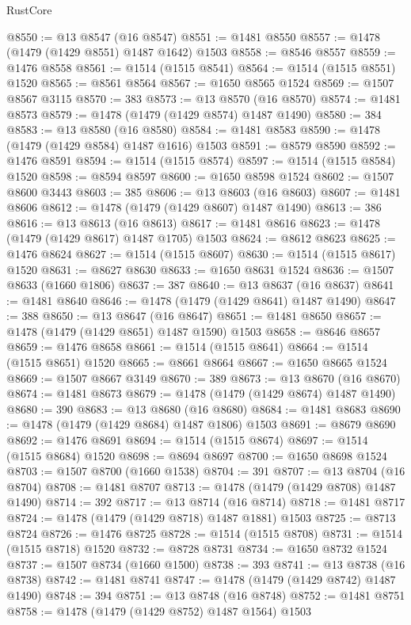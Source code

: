 \begin{lexlean}{RustCore}
\begin{coremodule}
@8550 := @13 @8547 (@16 @8547)
@8551 := @1481 @8550
@8557 := @1478 (@1479 (@1429 @8551) @1487 @1642) @1503
@8558 := @8546 @8557
@8559 := @1476 @8558
@8561 := @1514 (@1515 @8541)
@8564 := @1514 (@1515 @8551) @1520
@8565 := @8561 @8564
@8567 := @1650 @8565 @1524
@8569 := @1507 @8567 @3115
@8570 := 383
@8573 := @13 @8570 (@16 @8570)
@8574 := @1481 @8573
@8579 := @1478 (@1479 (@1429 @8574) @1487 @1490)
@8580 := 384
@8583 := @13 @8580 (@16 @8580)
@8584 := @1481 @8583
@8590 := @1478 (@1479 (@1429 @8584) @1487 @1616) @1503
@8591 := @8579 @8590
@8592 := @1476 @8591
@8594 := @1514 (@1515 @8574)
@8597 := @1514 (@1515 @8584) @1520
@8598 := @8594 @8597
@8600 := @1650 @8598 @1524
@8602 := @1507 @8600 @3443
@8603 := 385
@8606 := @13 @8603 (@16 @8603)
@8607 := @1481 @8606
@8612 := @1478 (@1479 (@1429 @8607) @1487 @1490)
@8613 := 386
@8616 := @13 @8613 (@16 @8613)
@8617 := @1481 @8616
@8623 := @1478 (@1479 (@1429 @8617) @1487 @1705) @1503
@8624 := @8612 @8623
@8625 := @1476 @8624
@8627 := @1514 (@1515 @8607)
@8630 := @1514 (@1515 @8617) @1520
@8631 := @8627 @8630
@8633 := @1650 @8631 @1524
@8636 := @1507 @8633 (@1660 @1806)
@8637 := 387
@8640 := @13 @8637 (@16 @8637)
@8641 := @1481 @8640
@8646 := @1478 (@1479 (@1429 @8641) @1487 @1490)
@8647 := 388
@8650 := @13 @8647 (@16 @8647)
@8651 := @1481 @8650
@8657 := @1478 (@1479 (@1429 @8651) @1487 @1590) @1503
@8658 := @8646 @8657
@8659 := @1476 @8658
@8661 := @1514 (@1515 @8641)
@8664 := @1514 (@1515 @8651) @1520
@8665 := @8661 @8664
@8667 := @1650 @8665 @1524
@8669 := @1507 @8667 @3149
@8670 := 389
@8673 := @13 @8670 (@16 @8670)
@8674 := @1481 @8673
@8679 := @1478 (@1479 (@1429 @8674) @1487 @1490)
@8680 := 390
@8683 := @13 @8680 (@16 @8680)
@8684 := @1481 @8683
@8690 := @1478 (@1479 (@1429 @8684) @1487 @1806) @1503
@8691 := @8679 @8690
@8692 := @1476 @8691
@8694 := @1514 (@1515 @8674)
@8697 := @1514 (@1515 @8684) @1520
@8698 := @8694 @8697
@8700 := @1650 @8698 @1524
@8703 := @1507 @8700 (@1660 @1538)
@8704 := 391
@8707 := @13 @8704 (@16 @8704)
@8708 := @1481 @8707
@8713 := @1478 (@1479 (@1429 @8708) @1487 @1490)
@8714 := 392
@8717 := @13 @8714 (@16 @8714)
@8718 := @1481 @8717
@8724 := @1478 (@1479 (@1429 @8718) @1487 @1881) @1503
@8725 := @8713 @8724
@8726 := @1476 @8725
@8728 := @1514 (@1515 @8708)
@8731 := @1514 (@1515 @8718) @1520
@8732 := @8728 @8731
@8734 := @1650 @8732 @1524
@8737 := @1507 @8734 (@1660 @1500)
@8738 := 393
@8741 := @13 @8738 (@16 @8738)
@8742 := @1481 @8741
@8747 := @1478 (@1479 (@1429 @8742) @1487 @1490)
@8748 := 394
@8751 := @13 @8748 (@16 @8748)
@8752 := @1481 @8751
@8758 := @1478 (@1479 (@1429 @8752) @1487 @1564) @1503

\end{coremodule}
\end{lexlean}
